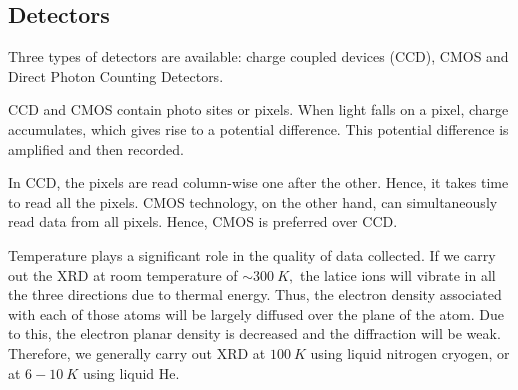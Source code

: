 \subsection{Detectors}

Three types of detectors are available: charge coupled devices (CCD), CMOS and Direct Photon Counting Detectors.

CCD and CMOS contain photo sites or pixels. When light falls on a pixel, charge accumulates, which gives rise to a potential difference. This potential difference is amplified and then recorded.

In CCD, the pixels are read column-wise one after the other. Hence, it takes time to read all the pixels. CMOS technology, on the other hand, can simultaneously read data from all pixels. Hence, CMOS is preferred over CCD.

Temperature plays a significant role in the quality of data collected. If we carry out the XRD at room temperature of $\sim \SI{300}{K},$ the latice ions will vibrate in all the three directions due to thermal energy. Thus, the electron density associated with each of those atoms will be largely diffused over the plane of the atom. Due to this, the electron planar density is decreased and the diffraction will be weak. Therefore, we generally carry out XRD at $\SI{100}{K}$ using liquid nitrogen cryogen, or at $6-10~\si{K}$ using liquid He.